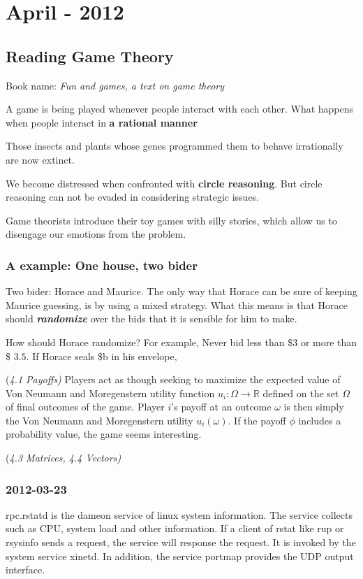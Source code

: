
\chapter{April - 2012} %

\label{ch:april:2012} %

\section{Reading Game Theory}
Book name: {\it Fun and games, a text on game theory}

A game is being played whenever people interact with each other. What happens when people interact in {\bf a rational manner}

Those insects and plants whose genes programmed them to behave irrationally are now extinct.

We become distressed when confronted with {\bf circle reasoning}. But circle reasoning can not be evaded in considering strategic issues. 

Game theorists introduce their toy games with silly stories, which allow us to disengage our emotions from the problem.

\subsection{A example: One house, two bider}
Two bider: Horace and Maurice. 
The only way that Horace can be sure of keeping Maurice guessing, is by using a mixed strategy. What this means is that Horace should {\it \bf randomize} over the bids that it is sensible for him to make.

How should Horace randomize? For example, Never bid less than \$3 or more than \$ $3.5$.
If Horace seals \$b in his envelope,


{(\it 4.1 Payoffs)} Players act as though seeking to maximize the expected value of Von Neumann and Moregenstern utility function $u_i : \Omega \rightarrow \mathbb{R} $ defined on the set $\Omega$ of final outcomes of the game. Player $i$'s payoff at an outcome $\omega$ is then simply the Von Neumann and Moregenstern utility $u_i(\omega)$.
If the payoff $\phi$ includes a probability value, the game seems interesting.

{(\it 4.3 Matrices, 4.4 Vectors)} 

\subsection{2012-03-23}
rpc.rstatd is the dameon service of linux system information. The service collects such as CPU, system load and other information. If a client of rstat like rup or rsysinfo sends a request, the service will response the request. It is invoked by the system service xinetd. In addition, the service portmap provides the UDP output interface.  

